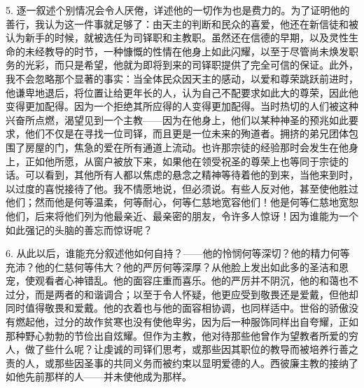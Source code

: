 5. 逐一叙述个别情况会令人厌倦，详述他的一切作为也是费力的。为了证明他的善行，我认为这一件事就足够了：由天主的判断和民众的喜爱，他还在新信徒和被认为新手的时候，就被选任为司铎职和主教职。虽然还在信德的早期，以及灵性生命的未经教导的时节，一种慷慨的性情在他身上如此闪耀，以至于尽管尚未焕发职务的光彩，而只是希望，他就为即将到来的司铎职提供了完全可信的保证。此外，我不会忽略那个显著的事实：当全体民众因天主的感动，以爱和尊荣跳跃前进时，他谦卑地退后，将位置让给更年长的人，认为自己不配要求如此大的尊荣，因此他变得更加配得。因为一个拒绝其所应得的人变得更加配得。当时热切的人们被这种兴奋所点燃，渴望见到一个主教——因为在他身上，他们以某种神圣的预兆如此要求，他们不仅是在寻找一位司铎，而且更是一位未来的殉道者。拥挤的弟兄团体包围了房屋的门，焦急的爱在所有通道上流动。也许那宗徒的经验那时会发生在他身上，正如他所愿，从窗户被放下来，如果他在领受祝圣的尊荣上也等同于宗徒的话。可以看到，其他所有人都以焦虑的悬念之精神等待着他的到来，当他来到时，以过度的喜悦接待了他。我不情愿地说，但必须说。有些人反对他，甚至使他胜过他们；然而他是何等温柔，何等耐心，何等仁慈地宽容他们！他是何等仁慈地宽恕他们，后来将他们列为他最亲近、最亲密的朋友，令许多人惊讶！因为谁能为一个如此强记的头脑的善忘而惊讶呢？\par

6. 从此以后，谁能充分叙述他如何自持？——他的怜悯何等深切？他的精力何等充沛？他的仁慈何等伟大？他的严厉何等深厚？从他脸上发出如此多的圣洁和恩宠，使观看者心神错乱。他的面容庄重而喜乐。他的严厉并不阴沉，他的和蔼也不过分，而是两者的和谐调合；以至于令人怀疑，他更应受到敬畏还是爱戴，但他却同时值得敬畏和爱戴。他的衣着也与他的面容相协调，也同样适中。世俗的骄傲没有燃起他，过分的故作贫寒也没有使他卑劣，因为后一种服饰同样出自夸耀，正如那种野心勃勃的节俭出自炫耀。但作为主教，他对待那些他曾作为望教者所爱的穷人，做了些什么呢？让虔诚的司铎们思考，或那些因其职位的教导而被培养行善之责的人，或那些因圣事的共同义务而被约束以显明爱德的人。西彼廉主教的接纳了如他先前那样的人——并未使他成为那样。\par

